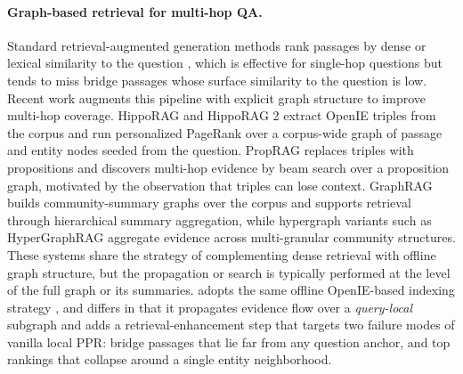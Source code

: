\paragraph{Graph-based retrieval for multi-hop QA.}
Standard retrieval-augmented generation methods rank passages by dense
or lexical similarity to the question
\citep{karpukhin2020dpr,robertson2009bm25}, which is effective for
single-hop questions but tends to miss bridge passages whose surface
similarity to the question is low. Recent work augments this pipeline
with explicit graph structure to improve multi-hop coverage.
HippoRAG \citep{jimenez2024hipporag} and HippoRAG 2
\citep{gutierrez2025hipporag} extract OpenIE triples from the corpus
and run personalized PageRank over a corpus-wide graph of passage and
entity nodes seeded from the question. PropRAG \citep{you2024proprag}
replaces triples with propositions and discovers multi-hop evidence by
beam search over a proposition graph, motivated by the observation
that triples can lose context. GraphRAG \citep{edge2024graphrag} builds
community-summary graphs over the corpus and supports retrieval through
hierarchical summary aggregation, while hypergraph variants such as
HyperGraphRAG aggregate evidence across multi-granular community
structures. These systems share the strategy of complementing dense
retrieval with offline graph structure, but the propagation or search
is typically performed at the level of the full graph or its summaries.
\methodname{} adopts the same offline OpenIE-based indexing strategy
\citep{angeli2015leveraging,gutierrez2025hipporag}, and differs in that
it propagates evidence flow over a \emph{query-local} subgraph and adds
a retrieval-enhancement step that targets two failure modes of vanilla
local PPR: bridge passages that lie far from any question anchor, and
top rankings that collapse around a single entity neighborhood.


